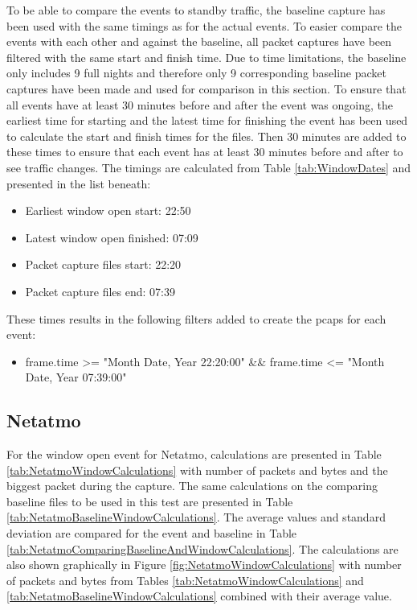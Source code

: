 To be able to compare the events to standby traffic, the baseline capture has been used with the same timings as for the actual events. To easier compare the events with each other and against the baseline, all packet captures have been filtered with the same start and finish time. Due to time limitations, the baseline only includes 9 full nights and therefore only 9 corresponding baseline packet captures have been made and used for comparison in this section. To ensure that all events have at least 30 minutes before and after the event was ongoing, the earliest time for starting and the latest time for finishing the event has been used to calculate the start and finish times for the files. Then 30 minutes are added to these times to ensure that each event has at least 30 minutes before and after to see traffic changes. The timings are calculated from Table \ref{tab:WindowDates} and presented in the list beneath: 

\begin{itemize}
    \item Earliest window open start: 22:50
    \item Latest window open finished: 07:09
    \item Packet capture files start: 22:20
    \item Packet capture files end: 07:39
\end{itemize}

These times results in the following filters added to create the pcaps for each event:
\begin{itemize}
    \item frame.time >= "Month Date, Year 22:20:00" \&\& frame.time <= "Month Date, Year 07:39:00"
\end{itemize}

\newpage
\subsection{Netatmo}
For the window open event for Netatmo, calculations are presented in Table \ref{tab:NetatmoWindowCalculations} with number of packets and bytes and the biggest packet during the capture. The same calculations on the comparing baseline files to be used in this test are presented in Table \ref{tab:NetatmoBaselineWindowCalculations}. The average values and standard deviation are compared for the event and baseline in Table \ref{tab:NetatmoComparingBaselineAndWindowCalculations}. The calculations are also shown graphically in Figure \ref{fig:NetatmoWindowCalculations} with number of packets and bytes from Tables \ref{tab:NetatmoWindowCalculations} and \ref{tab:NetatmoBaselineWindowCalculations} combined with their average value. 

